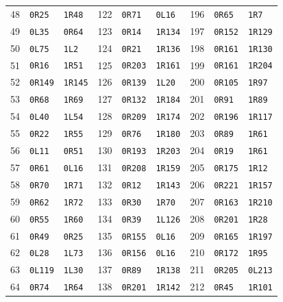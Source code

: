 \begin{longtable}{@{}rll@{\hspace{1.2em}}rll@{\hspace{1.2em}}rll@{}}
48 & \texttt{0R25} & \texttt{1R48} & 122 & \texttt{0R71} & \texttt{0L16} & 196 & \texttt{0R65} & \texttt{1R7}\\
49 & \texttt{0L35} & \texttt{0R64} & 123 & \texttt{0R14} & \texttt{1R134} & 197 & \texttt{0R152} & \texttt{1R129}\\
50 & \texttt{0L75} & \texttt{1L2} & 124 & \texttt{0R21} & \texttt{1R136} & 198 & \texttt{0R161} & \texttt{1R130}\\
51 & \texttt{0R16} & \texttt{1R51} & 125 & \texttt{0R203} & \texttt{1R161} & 199 & \texttt{0R161} & \texttt{1R204}\\
52 & \texttt{0R149} & \texttt{1R145} & 126 & \texttt{0R139} & \texttt{1L20} & 200 & \texttt{0R105} & \texttt{1R97}\\
53 & \texttt{0R68} & \texttt{1R69} & 127 & \texttt{0R132} & \texttt{1R184} & 201 & \texttt{0R91} & \texttt{1R89}\\
54 & \texttt{0L40} & \texttt{1L54} & 128 & \texttt{0R209} & \texttt{1R174} & 202 & \texttt{0R196} & \texttt{1R117}\\
55 & \texttt{0R22} & \texttt{1R55} & 129 & \texttt{0R76} & \texttt{1R180} & 203 & \texttt{0R89} & \texttt{1R61}\\
56 & \texttt{0L11} & \texttt{0R51} & 130 & \texttt{0R193} & \texttt{1R203} & 204 & \texttt{0R19} & \texttt{1R61}\\
57 & \texttt{0R61} & \texttt{0L16} & 131 & \texttt{0R208} & \texttt{1R159} & 205 & \texttt{0R175} & \texttt{1R12}\\
58 & \texttt{0R70} & \texttt{1R71} & 132 & \texttt{0R12} & \texttt{1R143} & 206 & \texttt{0R221} & \texttt{1R157}\\
59 & \texttt{0R62} & \texttt{1R72} & 133 & \texttt{0R30} & \texttt{1R70} & 207 & \texttt{0R163} & \texttt{1R210}\\
60 & \texttt{0R55} & \texttt{1R60} & 134 & \texttt{0R39} & \texttt{1L126} & 208 & \texttt{0R201} & \texttt{1R28}\\
61 & \texttt{0R49} & \texttt{0R25} & 135 & \texttt{0R155} & \texttt{0L16} & 209 & \texttt{0R165} & \texttt{1R197}\\
62 & \texttt{0L28} & \texttt{1L73} & 136 & \texttt{0R156} & \texttt{0L16} & 210 & \texttt{0R172} & \texttt{1R95}\\
63 & \texttt{0L119} & \texttt{1L30} & 137 & \texttt{0R89} & \texttt{1R138} & 211 & \texttt{0R205} & \texttt{0L213}\\
64 & \texttt{0R74} & \texttt{1R64} & 138 & \texttt{0R201} & \texttt{1R142} & 212 & \texttt{0R45} & \texttt{1R101}\\

\end{longtable}
